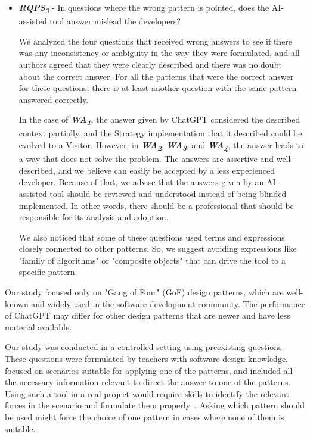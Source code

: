 \begin{itemize}
    \item  \textbf{\textit{RQPS\textsubscript{3}}} - In questions where the wrong pattern is pointed, does the AI-assisted tool answer mislead the developers?\label{sec5sub3}

    We analyzed the four questions that received wrong answers to see if there was any inconsistency or ambiguity in the way they were formulated, and all authors agreed that they were clearly described and there was no doubt about the correct answer. For all the patterns that were the correct answer for these questions, there is at least another question with the same pattern answered correctly.

    In the case of \textbf{\textit{WA\textsubscript{1}}}, the answer given by ChatGPT considered the described context partially, and the Strategy implementation that it described could be evolved to a Visitor. However, in \textbf{\textit{WA\textsubscript{2}}}, \textbf{\textit{WA\textsubscript{3}}}, and \textbf{\textit{WA\textsubscript{4}}}, the answer leads to a way that does not solve the problem. The answers are assertive and well-described, and we believe can easily be accepted by a less experienced developer. Because of that, we advise that the answers given by an AI-assisted tool should be reviewed and understood instead of being blinded implemented. In other words, there should be a professional that should be responsible for its analysis and adoption.
    
    We also noticed that some of these questions used terms and expressions closely connected to other patterns. So, we suggest avoiding expressions like "family of algorithms" or "composite objects" that can drive the tool to a specific pattern.
    
\end{itemize}

\label{sec5sub4}

Our study focused only on "Gang of Four" (GoF) design patterns, which are well-known and widely used in the software development community. The performance of ChatGPT may differ for other design patterns that are newer and have less material available.

Our study was conducted in a controlled setting using preexisting questions. These questions were formulated by teachers with software design knowledge, focused on scenarios suitable for applying one of the patterns, and included all the necessary information relevant to direct the answer to one of the patterns. Using such a tool in a real project would require skills to identify the relevant forces in the scenario and formulate them properly~\cite{White2023}. Asking which pattern should be used might force the choice of one pattern in cases where none of them is suitable.

